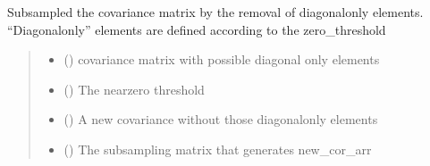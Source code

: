 \documentclass[letterpaper,10pt,english]{sphinxmanual}
\begin{document}
\begin{fulllineitems}
\label{\detokenize{kalman:glomar_gridding.autoregressive_kalman.cov_diagonal.remove_diag_only_rows}}
\pysigstartsignatures
\pysiglinewithargsret
{}
{\sphinxparamcomma {}}
{}
\pysigstopsignatures
\sphinxAtStartPar
Subsampled the covariance matrix by the removal of
diagonal\sphinxhyphen{}only elements. “Diagonal\sphinxhyphen{}only” elements are
defined according to the zero\_threshold
\begin{quote}\begin{description}
\begin{itemize}
\item {}
\sphinxAtStartPar
{} () \textendash{} covariance matrix with possible diagonal only elements

\item {}
\sphinxAtStartPar
{} () \textendash{} The near\sphinxhyphen{}zero threshold

\end{itemize}

\sphinxAtStartPar
{}

\sphinxAtStartPar
\begin{itemize}
\item {}
\sphinxAtStartPar
{} () \textendash{} A new covariance without those diagonal\sphinxhyphen{}only elements

\item {}
\sphinxAtStartPar
{} () \textendash{} The subsampling matrix that generates new\_cor\_arr

\end{itemize}


\end{description}\end{quote}

\end{fulllineitems}
\end{document}
